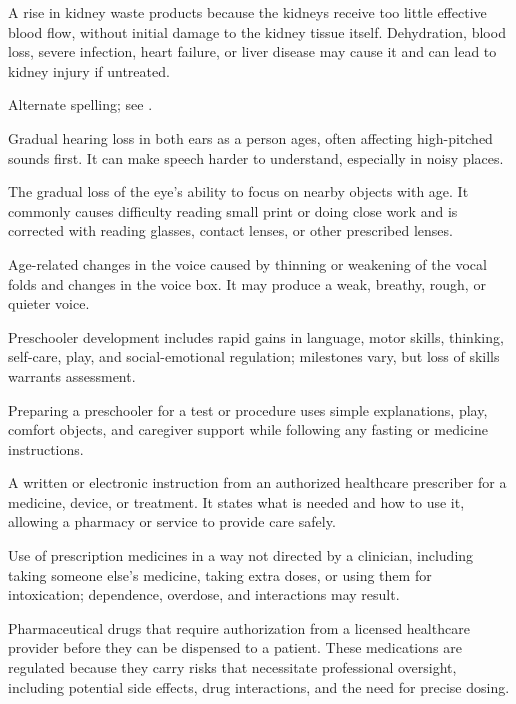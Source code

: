  A rise in kidney waste products because the kidneys receive too little effective blood flow, without initial damage to the kidney tissue itself. Dehydration, blood loss, severe infection, heart failure, or liver disease may cause it and can lead to kidney injury if untreated.

 Alternate spelling; see .

 Gradual hearing loss in both ears as a person ages, often affecting high-pitched sounds first. It can make speech harder to understand, especially in noisy places.

 The gradual loss of the eye’s ability to focus on nearby objects with age. It commonly causes difficulty reading small print or doing close work and is corrected with reading glasses, contact lenses, or other prescribed lenses.

 Age-related changes in the voice caused by thinning or weakening of the vocal folds and changes in the voice box. It may produce a weak, breathy, rough, or quieter voice.

 Preschooler development includes rapid gains in language, motor skills, thinking, self-care, play, and social-emotional regulation; milestones vary, but loss of skills warrants assessment.

 Preparing a preschooler for a test or procedure uses simple explanations, play, comfort objects, and caregiver support while following any fasting or medicine instructions.

 A written or electronic instruction from an authorized healthcare prescriber for a medicine, device, or treatment. It states what is needed and how to use it, allowing a pharmacy or service to provide care safely.

 Use of prescription medicines in a way not directed by a clinician, including taking someone else’s medicine, taking extra doses, or using them for intoxication; dependence, overdose, and interactions may result.

 Pharmaceutical drugs that require authorization from a licensed healthcare provider
before they can be dispensed to a patient. These medications are regulated because they
carry risks that necessitate professional oversight, including potential side effects,
drug interactions, and the need for precise dosing.

